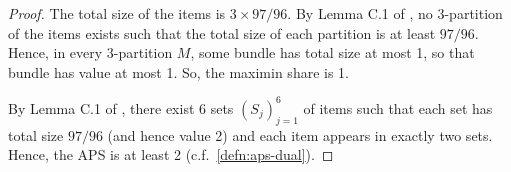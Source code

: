 \begin{proof}
The total size of the items is $3 \times 97/96$.
By Lemma C.1 of \citet{babaioff2023fair}, no $3$-partition of the items exists
such that the total size of each partition is at least $97/96$.
Hence, in every 3-partition $M$, some bundle has total size at most 1, so that bundle has value at most 1.
So, the maximin share is 1.

By Lemma C.1 of \citet{babaioff2023fair}, there exist 6 sets $(S_j)_{j=1}^6$ of items
such that each set has total size $97/96$ (and hence value 2) and each item appears in exactly two sets.
Hence, the APS is at least 2 (c.f.~\cref{defn:aps-dual}).
\end{proof}
